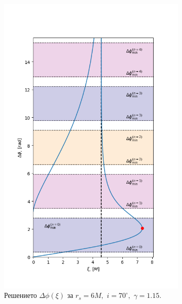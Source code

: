 \begin{figure}[!htb]
\begin{subfigure}{6cm}
		\includegraphics[scale = 0.32]{GB_70_deg_r6_gamma_1.15_impact.png}
		\caption{Решението $\Delta\phi(\xi)$ за $r_s = 6M,\,\, i = 70^\circ,\,\,\gamma = 1.15$.} 
	\end{subfigure}\,\,\,
	\begin{subfigure}{6cm}
		\hspace{-0.5cm}

\end{subfigure}
\end{figure}

